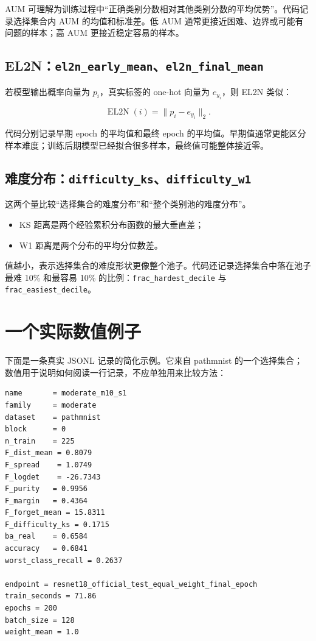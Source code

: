 \documentclass[UTF8,a4paper,12pt]{ctexart}
\newcommand{\code}[1]{\texttt{#1}}
\begin{document}
AUM 可理解为训练过程中“正确类别分数相对其他类别分数的平均优势”。代码记录选择集合内 AUM 的均值和标准差。低 AUM 通常更接近困难、边界或可能有问题的样本；高 AUM 更接近稳定容易的样本。

\subsection{EL2N：\code{el2n\_early\_mean}、\code{el2n\_final\_mean}}

若模型输出概率向量为 \(p_i\)，真实标签的 one-hot 向量为 \(e_{y_i}\)，则 EL2N 类似：

\[
\operatorname{EL2N}(i)=\lVert p_i-e_{y_i}\rVert_2.
\]

代码分别记录早期 epoch 的平均值和最终 epoch 的平均值。早期值通常更能区分样本难度；训练后期模型已经拟合很多样本，最终值可能整体接近零。

\subsection{难度分布：\code{difficulty\_ks}、\code{difficulty\_w1}}

这两个量比较“选择集合的难度分布”和“整个类别池的难度分布”。

\begin{itemize}
  \item KS 距离是两个经验累积分布函数的最大垂直差；
  \item W1 距离是两个分布的平均分位数差。
\end{itemize}

值越小，表示选择集合的难度形状更像整个池子。代码还记录选择集合中落在池子最难 10\% 和最容易 10\% 的比例：\code{frac\_hardest\_decile} 与 \code{frac\_easiest\_decile}。

\section{一个实际数值例子}

下面是一条真实 JSONL 记录的简化示例。它来自 pathmnist 的一个选择集合；数值用于说明如何阅读一行记录，不应单独用来比较方法：

\begin{lstlisting}
name       = moderate_m10_s1
family     = moderate
dataset    = pathmnist
block      = 0
n_train    = 225
F_dist_mean = 0.8079
F_spread    = 1.0749
F_logdet    = -26.7343
F_purity   = 0.9956
F_margin   = 0.4364
F_forget_mean = 15.8311
F_difficulty_ks = 0.1715
ba_real    = 0.6584
accuracy   = 0.6841
worst_class_recall = 0.2637

endpoint = resnet18_official_test_equal_weight_final_epoch
train_seconds = 71.86
epochs = 200
batch_size = 128
weight_mean = 1.0
\end{lstlisting}
\end{document}
